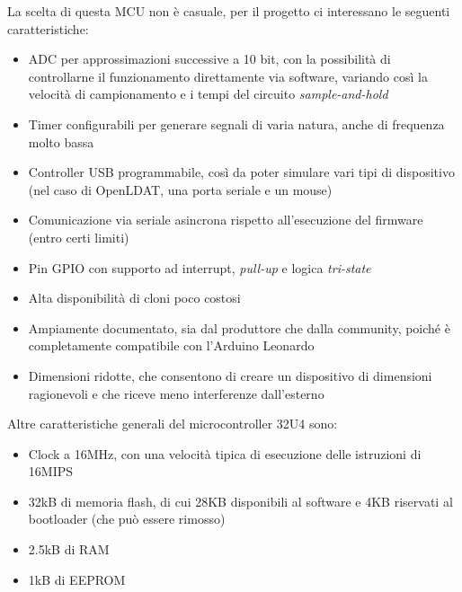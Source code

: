 La scelta di questa MCU non è casuale, per il progetto ci interessano le seguenti caratteristiche:
\begin{itemize}
	\item ADC per approssimazioni successive a 10 bit, con la possibilità di controllarne il funzionamento direttamente via software, variando così la velocità di campionamento e i tempi del circuito \textit{sample-and-hold}
	\item Timer configurabili per generare segnali di varia natura, anche di frequenza molto bassa
	\item Controller USB programmabile, così da poter simulare vari tipi di dispositivo (nel caso di OpenLDAT, una porta seriale e un mouse)
	\item Comunicazione via seriale asincrona rispetto all'esecuzione del firmware (entro certi limiti)
	\item Pin GPIO con supporto ad interrupt, \textit{pull-up} e logica \textit{tri-state}
	\item Alta disponibilità di cloni poco costosi
	\item Ampiamente documentato, sia dal produttore che dalla community, poiché è completamente compatibile con l'Arduino Leonardo
	\item Dimensioni ridotte, che consentono di creare un dispositivo di dimensioni ragionevoli e che riceve meno interferenze dall'esterno
\end{itemize}

Altre caratteristiche generali del microcontroller 32U4 sono:
\begin{itemize}
	\item Clock a 16MHz, con una velocità tipica di esecuzione delle istruzioni di 16MIPS
	\item 32kB di memoria flash, di cui 28KB disponibili al software e 4KB riservati al bootloader (che può essere rimosso)
	\item 2.5kB di RAM
	\item 1kB di EEPROM
\end{itemize}

